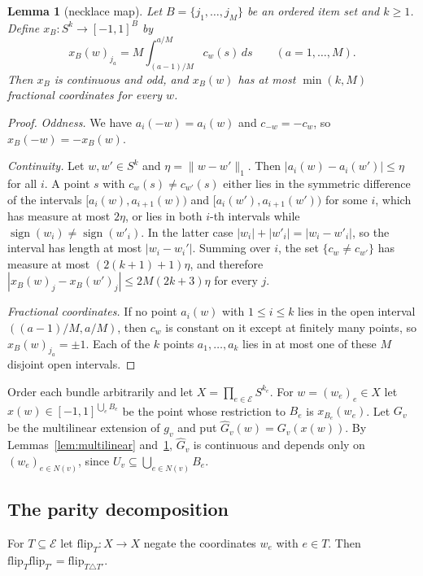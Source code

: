 \documentclass[11pt,letterpaper]{article}
\newtheorem{lemma}[theorem]{Lemma}
\theoremstyle{definition}
\newcommand{\cE}{\mathcal{E}}
\newcommand{\flip}{\mathrm{flip}}
\newcommand{\hG}{\widehat{G}}
\begin{document}
\begin{lemma}[necklace map]\label{lem:necklace}
Let $B=\{j_1,\dots,j_M\}$ be an ordered item set and $k\ge1$. Define $x_B\colon S^k\to[-1,1]^B$ by
\[
  x_B(w)_{j_a}=M\int_{(a-1)/M}^{a/M}c_w(s)\,ds\qquad(a=1,\dots,M).
\]
Then $x_B$ is continuous and odd, and $x_B(w)$ has at most $\min(k,M)$ fractional coordinates for
every $w$.
\end{lemma}

\begin{proof}
\emph{Oddness.} We have $a_i(-w)=a_i(w)$ and $c_{-w}=-c_w$, so $x_B(-w)=-x_B(w)$.

\emph{Continuity.} Let $w,w'\in S^k$ and $\eta=\|w-w'\|_1$. Then $|a_i(w)-a_i(w')|\le\eta$ for
all $i$. A point $s$ with $c_w(s)\ne c_{w'}(s)$ either lies in the symmetric difference of the
intervals $[a_i(w),a_{i+1}(w))$ and $[a_i(w'),a_{i+1}(w'))$ for some $i$, which has measure at most
$2\eta$, or lies in both $i$-th intervals while $\operatorname{sign}(w_i)\ne\operatorname{sign}(w'_i)$.
In the latter case $|w_i|+|w'_i|=|w_i-w'_i|$, so the interval has length at most $|w_i-w_i'|$.
Summing over $i$, the set $\{c_w\ne c_{w'}\}$ has measure at most $(2(k+1)+1)\eta$, and therefore
$|x_B(w)_j-x_B(w')_j|\le2M(2k+3)\eta$ for every $j$.

\emph{Fractional coordinates.} If no point $a_i(w)$ with $1\le i\le k$ lies in the open interval
$((a-1)/M,a/M)$, then $c_w$ is constant on it except at finitely many points, so
$x_B(w)_{j_a}=\pm1$. Each of the $k$ points $a_1,\dots,a_k$ lies in at most one of these $M$
disjoint open intervals.
\end{proof}

Order each bundle arbitrarily and let $X=\prod_{e\in\cE}S^{k_e}$. For $w=(w_e)_e\in X$ let
$x(w)\in[-1,1]^{\bigcup_eB_e}$ be the point whose restriction to $B_e$ is $x_{B_e}(w_e)$. Let $G_v$
be the multilinear extension of $g_v$ and put $\hG_v(w)=G_v(x(w))$. By Lemmas~\ref{lem:multilinear}
and~\ref{lem:necklace}, $\hG_v$ is continuous and depends only on $(w_e)_{e\in N(v)}$, since
$U_v\subseteq\bigcup_{e\in N(v)}B_e$.

\subsection{The parity decomposition}

For $T\subseteq\cE$ let $\flip_T\colon X\to X$ negate the coordinates $w_e$ with $e\in T$. Then
$\flip_T\flip_{T'}=\flip_{T\triangle T'}$.
\end{document}
